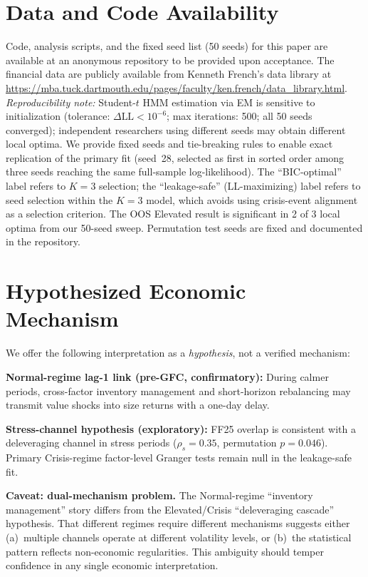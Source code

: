\documentclass[sigconf,anonymous]{acmart}
\begin{document}
\section*{Data and Code Availability}

Code, analysis scripts, and the fixed seed list (50 seeds) for this paper are available at an anonymous repository to be provided upon acceptance. The financial data are publicly available from Kenneth French's data library at \url{https://mba.tuck.dartmouth.edu/pages/faculty/ken.french/data_library.html}. \emph{Reproducibility note:} Student-$t$ HMM estimation via EM is sensitive to initialization (tolerance: $\Delta\text{LL} < 10^{-6}$; max iterations: 500; all 50 seeds converged); independent researchers using different seeds may obtain different local optima. We provide fixed seeds and tie-breaking rules to enable exact replication of the primary fit (seed~28, selected as first in sorted order among three seeds reaching the same full-sample log-likelihood). The ``BIC-optimal'' label refers to $K = 3$ selection; the ``leakage-safe'' (LL-maximizing) label refers to seed selection within the $K = 3$ model, which avoids using crisis-event alignment as a selection criterion. The OOS Elevated result is significant in 2 of 3 local optima from our 50-seed sweep. Permutation test seeds are fixed and documented in the repository.

\appendix

\section{Hypothesized Economic Mechanism}
\label{app:mechanism}

We offer the following interpretation as a \emph{hypothesis}, not a verified mechanism:

\textbf{Normal-regime lag-1 link (pre-GFC, confirmatory):} During calmer periods,
cross-factor inventory management and short-horizon rebalancing may transmit
value shocks into size returns with a one-day delay.

\textbf{Stress-channel hypothesis (exploratory):} FF25 overlap is consistent with
a deleveraging channel in stress periods
($\rho_s = 0.35$, permutation $p = 0.046$). Primary Crisis-regime factor-level
Granger tests remain null in the leakage-safe fit.

\textbf{Caveat: dual-mechanism problem.} The Normal-regime ``inventory management''
story differs from the Elevated/Crisis ``deleveraging cascade'' hypothesis.
That different regimes require different mechanisms suggests either (a)~multiple
channels operate at different volatility levels, or (b)~the statistical pattern
reflects non-economic regularities. This ambiguity should temper confidence in
any single economic interpretation.
\end{document}
